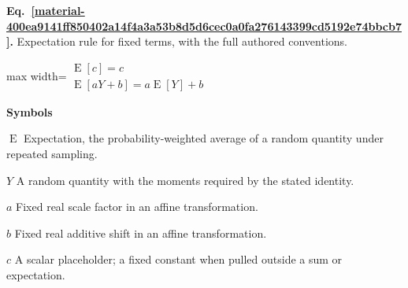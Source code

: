 \documentclass[11pt,a4paper]{article}
\begin{document}
\par\medskip
\begin{samepage}
\label{material-400ea9141ff850402a14f4a3a53b8d5d6cec0a0fa276143399cd5192e74bbcb7}
\noindent\textbf{Eq.~\ref*{material-400ea9141ff850402a14f4a3a53b8d5d6cec0a0fa276143399cd5192e74bbcb7}.} Expectation rule for fixed terms, with the full authored conventions.\par\nopagebreak
\begin{center}\begin{adjustbox}{max width=\linewidth}$\displaystyle \begin{gathered}\operatorname{E}[c]=c\\\operatorname{E}[aY+b]=a\operatorname{E}[Y]+b\end{gathered}$\end{adjustbox}\end{center}

\par\noindent\textbf{Symbols}

\par\noindent\textbf{\(\operatorname{E}\)} Expectation, the probability-weighted average of a random quantity under repeated sampling.

\par\noindent\textbf{\(Y\)} A random quantity with the moments required by the stated identity.

\par\noindent\textbf{\(a\)} Fixed real scale factor in an affine transformation.

\par\noindent\textbf{\(b\)} Fixed real additive shift in an affine transformation.

\par\noindent\textbf{\(c\)} A scalar placeholder; a fixed constant when pulled outside a sum or expectation.

\end{samepage}
\medskip
\end{document}
